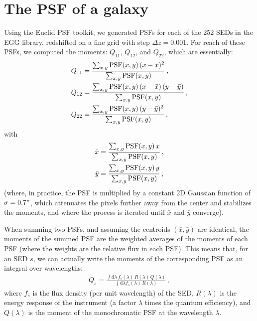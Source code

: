 \documentclass[11pt,a4paper]{article}
\newcommand{\dd}{\mathrm{d}}
\numberwithin{equation}{section}
\begin{document}
\section{The PSF of a galaxy}

Using the Euclid PSF toolkit, we generated PSFs for each of the 252 SEDs in the EGG library, redshifted on a fine grid with step $\Delta z = 0.001$. For reach of these PSFs, we computed the moments: $Q_{11}$, $Q_{12}$, and $Q_{22}$, which are essentially:
\begin{align}
Q_{11} &= \frac{\sum_{x, y} {\rm PSF}(x,y)\,(x - \bar{x})^2}{\sum_{x, y} {\rm PSF}(x,y)}\,, \\
Q_{12} &= \frac{\sum_{x, y} {\rm PSF}(x,y)\,(x - \bar{x})\,(y - \bar{y})}{\sum_{x, y} {\rm PSF}(x,y)}\,, \\
Q_{22} &= \frac{\sum_{x, y} {\rm PSF}(x,y)\,(y - \bar{y})^2}{\sum_{x, y} {\rm PSF}(x,y)}\,, \\
\end{align}
with
\begin{align}
\bar{x} &= \frac{\sum_{x, y} {\rm PSF}(x,y)\,x}{\sum_{x, y} {\rm PSF}(x,y)}\,, \\
\bar{y} &= \frac{\sum_{x, y} {\rm PSF}(x,y)\,y}{\sum_{x, y} {\rm PSF}(x,y)}\,,
\end{align}
(where, in practice, the PSF is multiplied by a constant 2D Gaussian function of $\sigma=0.7"$, which attenuates the pixels further away from the center and stabilizes the moments, and where the process is iterated until $\bar{x}$ and $\bar{y}$ converge).

When summing two PSFs, and assuming the centroids $(\bar{x},\bar{y})$ are identical, the moments of the summed PSF are the weighted averages of the moments of each PSF (where the weights are the relative flux in each PSF). This means that, for an SED $s$, we can actually write the moments of the corresponding PSF as an integral over wavelengths:
\begin{align}
Q_s = \frac{\int \dd\lambda\,f_s(\lambda)\,R(\lambda)\,Q(\lambda)}{\int \dd\lambda f_s(\lambda)\,R(\lambda)}\,,
\end{align}
where $f_s$ is the flux density (per unit wavelength) of the SED, $R(\lambda)$ is the energy response of the instrument (a factor $\lambda$ times the quantum efficiency), and $Q(\lambda)$ is the moment of the monochromatic PSF at the wavelength $\lambda$.
\end{document}
